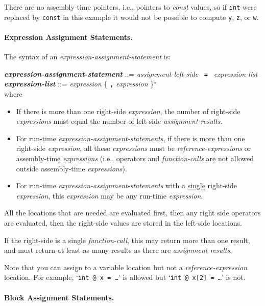 \documentclass[12pt]{article}
\newcommand{\subsubsubsection}[1]{\paragraph[#1]{#1.}}
\newcommand{\TT}[1]{{\tt \bfseries #1}}
\newcommand{\STAR}{{\Large $^\star$}}
\newcommand{\emkey}[1]{{\em \bfseries #1}}
\newenvironment{indpar}[1][0.3in]%
	{\begin{list}{}%
		     {\setlength{\itemsep}{0in}%
		      \setlength{\topsep}{0in}%
		      \setlength{\parsep}{1ex}%
		      \setlength{\labelwidth}{#1}%
		      \setlength{\leftmargin}{#1}%
		      \addtolength{\leftmargin}{\labelsep}}%
	 \item}%
	{\end{list}}
\begin{document}
There are no assembly-time pointers, i.e., pointers to {\em const} values,
so if {\tt int} were replaced by {\tt const} in this example
it would not be possible to compute {\tt y}, {\tt z}, or {\tt w}.

\subsubsubsection{Expression Assignment Statements}
\label{EXPRESSION-ASSIGNMENT-STATEMENTS}

The syntax of an {\em expression-assign\-ment-statement} is:
\begin{indpar}
\emkey{expression-assignment-statement} ::=
    {\em assignment-left-side} ~\TT{=}~ {\em expression-list}
\\[0.5ex]
\emkey{expression-list}\label{EXPRESSION-LIST} ::=
	      {\em expression} \{ \TT{,} {\em expression} \}\STAR{}
\\[2.0ex]
where
\begin{itemize}
\item If there is more than one right-side {\em expression},
the number of right-side {\em expressions} must equal the number
of left-side {\em assignment-results}.
\item For run-time {\em expression-assignment-statements}, if
there is \underline{more than one} right-side {\em expression}, all these
{\em expressions} must be {\em reference-expressions} or
assembly-time {\em expressions} (i.e., operators and
{\em function-calls} are not allowed outside assem\-bly-time
{\em expressions}).
\item For run-time {\em expression-assignment-statements} with
a \underline{single} right-side {\em expression}, this {\em expression}
may be any run-time {\em expression}.
\end{itemize}
\end{indpar}

All the locations that are needed are evaluated first, then any right
side operators are evaluated, then the right-side values are stored
in the left-side locations.

If the right-side is a single {\em function-call},
this may return more than one result, and must return
at least as many results as there are {\em assignment-results}.

Note that you can assign to a variable location but not a
{\em reference-expression} location.  For example, `{\tt int @ x = \ldots}'
is allowed but `{\tt int @ x[2] = \ldots}' is not.



\subsubsubsection{Block Assignment Statements}
\label{BLOCK-ASSIGNMENT-STATEMENTS}
\end{document}
